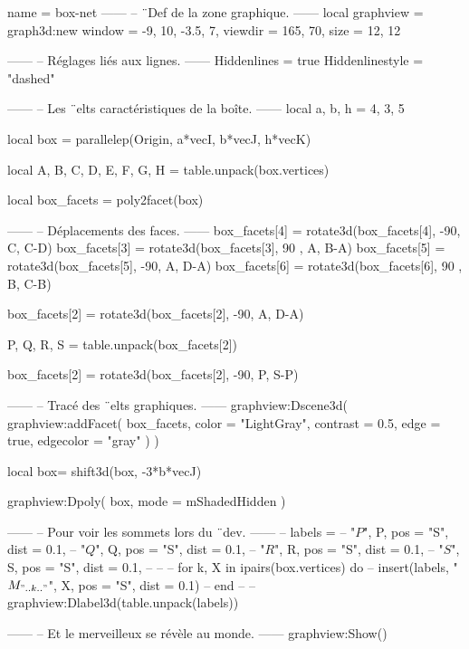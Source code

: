 \documentclass{standalone}
\begin{document}
\begin{luadraw}{name = box-net}
------
-- ¨Def de la zone graphique.
------
local graphview = graph3d:new{
  window  = {-9, 10, -3.5, 7},
  viewdir = {165, 70},
  size    = {12, 12}
}

------
-- Réglages liés aux lignes.
------
Hiddenlines     = true
Hiddenlinestyle = "dashed"

------
-- Les ¨elts caractéristiques de la boîte.
------
local a, b, h = 4, 3, 5

local box = parallelep(Origin, a*vecI, b*vecJ, h*vecK)

local A, B, C, D, E, F, G, H = table.unpack(box.vertices)

local box_facets = poly2facet(box)

------
-- Déplacements des faces.
------
box_facets[4] = rotate3d(box_facets[4], -90, {C, C-D})
box_facets[3] = rotate3d(box_facets[3], 90 , {A, B-A})
box_facets[5] = rotate3d(box_facets[5], -90, {A, D-A})
box_facets[6] = rotate3d(box_facets[6], 90 , {B, C-B})

box_facets[2] = rotate3d(box_facets[2], -90, {A, D-A})

P, Q, R, S = table.unpack(box_facets[2])

box_facets[2] = rotate3d(box_facets[2], -90, {P, S-P})

------
-- Tracé des ¨elts graphiques.
------
graphview:Dscene3d(
  graphview:addFacet(
    box_facets,
    {
      color     = "LightGray",
      contrast  = 0.5,
      edge      = true,
      edgecolor = "gray"
    }
  )
)

local box= shift3d(box, -3*b*vecJ)

graphview:Dpoly(
  box,
  {mode = mShadedHidden}
)

------
-- Pour voir les sommets lors du ¨dev.
------
-- labels = {
--   "$P$", P, {pos = "S", dist = 0.1},
--   "$Q$", Q, {pos = "S", dist = 0.1},
--   "$R$", R, {pos = "S", dist = 0.1},
--   "$S$", S, {pos = "S", dist = 0.1},
-- }
--
-- for k, X in ipairs(box.vertices) do
--   insert(labels, {"$M_{".. k .."}$", X, {pos = "S", dist = 0.1}})
-- end
--
-- graphview:Dlabel3d(table.unpack(labels))

------
-- Et le merveilleux se révèle au monde.
------
graphview:Show()
\end{luadraw}
\end{document}
